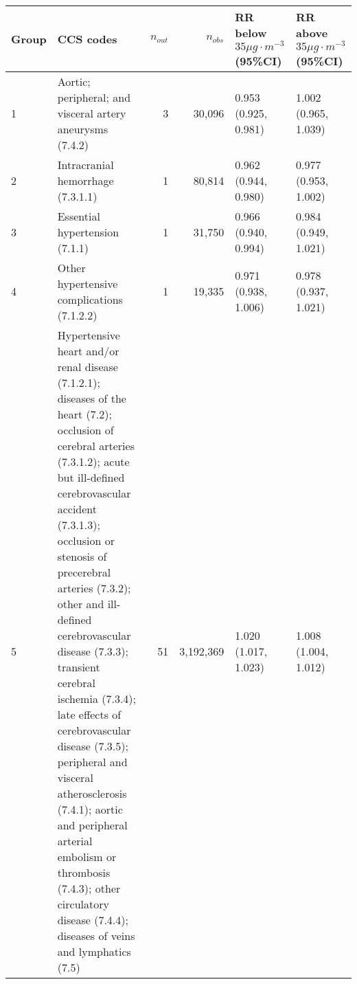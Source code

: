\begin{tabular}{lp{6.5cm}rrp{2.2cm}p{2.2cm}}
  \hline
Group & CCS codes & $n_{out}$ & $n_{obs}$ & RR below $35 \mu g \cdot m^{-3}$ (95\%CI) & RR above $35 \mu g \cdot m^{-3}$ (95\%CI) \\ 
  \hline
   1 & Aortic; peripheral; and visceral artery aneurysms (7.4.2) &    3 & 30,096 & 0.953 (0.925, 0.981) & 1.002 (0.965, 1.039) \\ 
     2 & Intracranial hemorrhage (7.3.1.1) &    1 & 80,814 & 0.962 (0.944, 0.980) & 0.977 (0.953, 1.002) \\ 
     3 & Essential hypertension (7.1.1) &    1 & 31,750 & 0.966 (0.940, 0.994) & 0.984 (0.949, 1.021) \\ 
     4 & Other hypertensive complications (7.1.2.2) &    1 & 19,335 & 0.971 (0.938, 1.006) & 0.978 (0.937, 1.021) \\ 
     5 & Hypertensive heart and/or renal disease (7.1.2.1); diseases of the heart (7.2); occlusion of cerebral arteries (7.3.1.2); acute but ill-defined cerebrovascular accident (7.3.1.3); occlusion or stenosis of precerebral arteries (7.3.2); other and ill-defined cerebrovascular disease (7.3.3); transient cerebral ischemia (7.3.4); late effects of cerebrovascular disease (7.3.5); peripheral and visceral atherosclerosis (7.4.1); aortic and peripheral arterial embolism or thrombosis (7.4.3); other circulatory disease (7.4.4); diseases of veins and lymphatics (7.5) &   51 & 3,192,369 & 1.020 (1.017, 1.023) & 1.008 (1.004, 1.012) \\ 
   \hline
\end{tabular}


